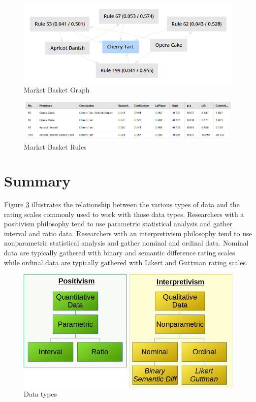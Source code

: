 \begin{figure}[H]
	\centering
	\includegraphics[width=\maxwidth{.95\linewidth}]{gfx/06-MarketBasketGraph}
	\caption{Market Basket Graph}
	\label{fig06.06}
\end{figure}


\begin{figure}[H]
	\centering
	\includegraphics[width=\maxwidth{.95\linewidth}]{gfx/06-MarketBasketRules}
	\caption{Market Basket Rules}
	\label{fig06.07}
\end{figure}


\section{Summary}\label{ch06:summary}

Figure \ref{fig06.04} illustrates the relationship between the various types of data and the rating scales commonly used to work with those data types. Researchers with a positivism philosophy tend to use parametric statistical analysis and gather interval and ratio data. Researchers with an interpretivism philosophy tend to use nonparametric statistical analysis and gather nominal and ordinal data. Nominal data are typically gathered with binary and semantic difference rating scales while ordinal data are typically gathered with Likert and Guttman rating scales.

\begin{figure}[H]
	\centering
	\includegraphics[width=\maxwidth{.95\linewidth}]{gfx/06-DataTypes}
	\caption{Data types}
	\label{fig06.04}
\end{figure}
